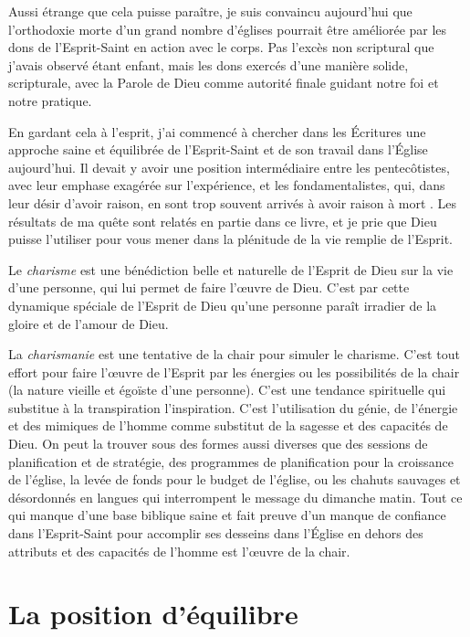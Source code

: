 Aussi étrange que cela puisse paraître, je suis convaincu aujourd'hui que l'orthodoxie morte d'un grand nombre d'églises pourrait être améliorée par les dons de l'Esprit-Saint en action avec le corps. Pas l'excès non scriptural que j'avais observé étant enfant, mais les dons exercés d'une manière solide, scripturale, avec la Parole de Dieu comme autorité finale guidant notre foi et notre pratique.

En gardant cela à l'esprit, j'ai commencé à chercher dans les Écritures une approche saine et équilibrée de l'Esprit-Saint et de son travail dans l'Église aujourd'hui. Il devait y avoir une position intermédiaire entre les pentecôtistes, avec leur emphase exagérée sur l'expérience, et les fondamentalistes, qui, dans leur désir d'avoir raison, en sont trop souvent arrivés à avoir raison à mort . Les résultats de ma quête sont relatés en partie dans ce livre, et je prie que Dieu puisse l'utiliser pour vous mener dans la plénitude de la vie remplie de l'Esprit.

Le \emph{charisme} est une bénédiction belle et naturelle de l'Esprit de Dieu sur la vie d'une personne, qui lui permet de faire l'œuvre de Dieu. C'est par cette dynamique spéciale de l'Esprit de Dieu qu'une personne paraît irradier de la gloire et de l'amour de Dieu.

La \emph{charismanie} est une tentative de la chair pour simuler le charisme. C'est tout effort pour faire l'œuvre de l'Esprit par les énergies ou les possibilités de la chair (la nature vieille et égoïste d'une personne). C'est une tendance spirituelle qui substitue à la transpiration l'inspiration. C'est l'utilisation du génie, de l'énergie et des mimiques de l'homme comme substitut de la sagesse et des capacités de Dieu. On peut la trouver sous des formes aussi diverses que des sessions de planification et de stratégie, des programmes de planification pour la croissance de l'église, la levée de fonds pour le budget de l'église, ou les chahuts sauvages et désordonnés en langues qui interrompent le message du dimanche matin. Tout ce qui manque d'une base biblique saine et fait preuve d'un manque de confiance dans l'Esprit-Saint pour accomplir ses desseins dans l'Église en dehors des attributs et des capacités de l'homme est l'œuvre de la chair.

\section{La position d'équilibre}

